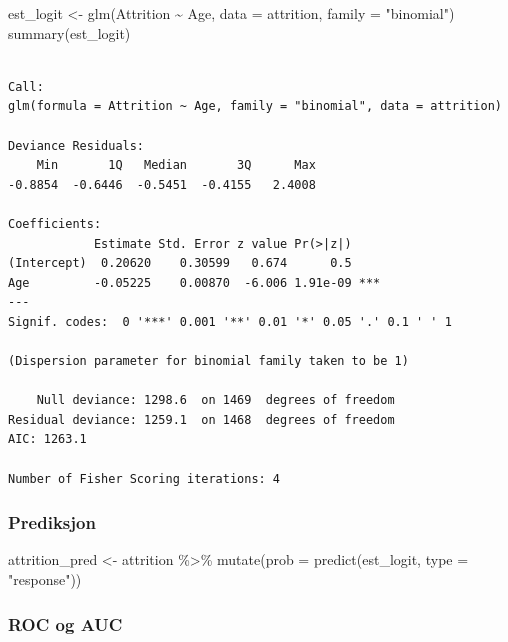 \documentclass[
  letterpaper,
  DIV=11,
  numbers=noendperiod]{scrreprt}
\newenvironment{Shaded}{\begin{snugshade}}{\end{snugshade}}
\newcommand{\AttributeTok}[1]{\textcolor[rgb]{0.40,0.45,0.13}{#1}}
\newcommand{\FunctionTok}[1]{\textcolor[rgb]{0.28,0.35,0.67}{#1}}
\newcommand{\NormalTok}[1]{\textcolor[rgb]{0.00,0.23,0.31}{#1}}
\newcommand{\OtherTok}[1]{\textcolor[rgb]{0.00,0.23,0.31}{#1}}
\newcommand{\SpecialCharTok}[1]{\textcolor[rgb]{0.37,0.37,0.37}{#1}}
\newcommand{\StringTok}[1]{\textcolor[rgb]{0.13,0.47,0.30}{#1}}
\theoremstyle{definition}
\theoremstyle{remark}
\begin{document}
\begin{Shaded}
\begin{Highlighting}[]
\NormalTok{est\_logit }\OtherTok{\textless{}{-}} \FunctionTok{glm}\NormalTok{(Attrition }\SpecialCharTok{\textasciitilde{}}\NormalTok{ Age, }\AttributeTok{data =}\NormalTok{ attrition, }\AttributeTok{family =} \StringTok{"binomial"}\NormalTok{)}
\FunctionTok{summary}\NormalTok{(est\_logit)}
\end{Highlighting}
\end{Shaded}

\begin{verbatim}

Call:
glm(formula = Attrition ~ Age, family = "binomial", data = attrition)

Deviance Residuals: 
    Min       1Q   Median       3Q      Max  
-0.8854  -0.6446  -0.5451  -0.4155   2.4008  

Coefficients:
            Estimate Std. Error z value Pr(>|z|)    
(Intercept)  0.20620    0.30599   0.674      0.5    
Age         -0.05225    0.00870  -6.006 1.91e-09 ***
---
Signif. codes:  0 '***' 0.001 '**' 0.01 '*' 0.05 '.' 0.1 ' ' 1

(Dispersion parameter for binomial family taken to be 1)

    Null deviance: 1298.6  on 1469  degrees of freedom
Residual deviance: 1259.1  on 1468  degrees of freedom
AIC: 1263.1

Number of Fisher Scoring iterations: 4
\end{verbatim}

\hypertarget{prediksjon}{%
\subsubsection{Prediksjon}\label{prediksjon}}

\begin{Shaded}
\begin{Highlighting}[]
\NormalTok{attrition\_pred }\OtherTok{\textless{}{-}}\NormalTok{ attrition }\SpecialCharTok{\%\textgreater{}\%} 
  \FunctionTok{mutate}\NormalTok{(}\AttributeTok{prob =} \FunctionTok{predict}\NormalTok{(est\_logit, }\AttributeTok{type =} \StringTok{"response"}\NormalTok{))}
\end{Highlighting}
\end{Shaded}

\hypertarget{roc-og-auc}{%
\subsubsection{ROC og AUC}\label{roc-og-auc}}
\end{document}
